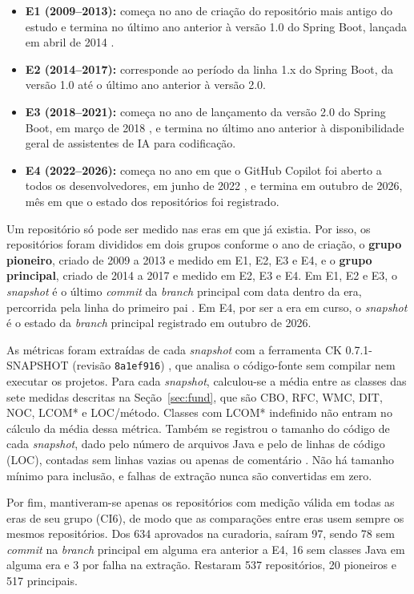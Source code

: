 \begin{itemize}
    \item \textbf{E1 (2009--2013):} começa no ano de criação do repositório mais antigo do estudo e termina no último ano anterior à versão 1.0 do Spring Boot, lançada em abril de 2014 \cite{springboot:2014}.
    \item \textbf{E2 (2014--2017):} corresponde ao período da linha 1.x do Spring Boot, da versão 1.0 até o último ano anterior à versão 2.0.
    \item \textbf{E3 (2018--2021):} começa no ano de lançamento da versão 2.0 do Spring Boot, em março de 2018 \cite{springboot:2018}, e termina no último ano anterior à disponibilidade geral de assistentes de IA para codificação.
    \item \textbf{E4 (2022--2026):} começa no ano em que o GitHub Copilot foi aberto a todos os desenvolvedores, em junho de 2022 \cite{copilot:2022}, e termina em outubro de 2026, mês em que o estado dos repositórios foi registrado.
\end{itemize}

Um repositório só pode ser medido nas eras em que já existia. Por isso, os repositórios foram divididos em dois grupos conforme o ano de criação, o \textbf{grupo pioneiro}, criado de 2009 a 2013 e medido em E1, E2, E3 e E4, e o \textbf{grupo principal}, criado de 2014 a 2017 e medido em E2, E3 e E4. Em E1, E2 e E3, o \emph{snapshot} é o último \emph{commit} da \emph{branch} principal com data dentro da era, percorrida pela linha do primeiro pai \cite{git:firstparent}. Em E4, por ser a era em curso, o \emph{snapshot} é o estado da \emph{branch} principal registrado em outubro de 2026.

As métricas foram extraídas de cada \emph{snapshot} com a ferramenta CK 0.7.1-SNAPSHOT (revisão \texttt{8a1ef916}) \cite{aniche:ck}, que analisa o código-fonte sem compilar nem executar os projetos. Para cada \emph{snapshot}, calculou-se a média entre as classes das sete medidas descritas na Seção~\ref{sec:fund}, que são CBO, RFC, WMC, DIT, NOC, LCOM* e LOC/método. Classes com LCOM* indefinido não entram no cálculo da média dessa métrica. Também se registrou o tamanho do código de cada \emph{snapshot}, dado pelo número de arquivos Java e pelo de linhas de código (LOC), contadas sem linhas vazias ou apenas de comentário \cite{park:1992:size}. Não há tamanho mínimo para inclusão, e falhas de extração nunca são convertidas em zero.

Por fim, mantiveram-se apenas os repositórios com medição válida em todas as eras de seu grupo (CI6), de modo que as comparações entre eras usem sempre os mesmos repositórios. Dos 634 aprovados na curadoria, saíram 97, sendo 78 sem \emph{commit} na \emph{branch} principal em alguma era anterior a E4, 16 sem classes Java em alguma era e 3 por falha na extração. Restaram 537 repositórios, 20 pioneiros e 517 principais.

